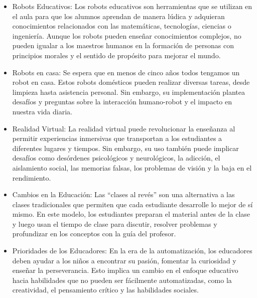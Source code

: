 \documentclass[letterpaper, 12pt]{article}
\begin{document}
\begin{itemize}[label=$\triangleright$]
      \item Robots Educativos: Los robots educativos son herramientas
            que se utilizan en el aula para que los alumnos aprendan de
            manera lúdica y adquieran conocimientos relacionados con
            las matemáticas, tecnologías, ciencias o ingeniería. Aunque
            los robots pueden enseñar conocimientos complejos, no
            pueden igualar a los maestros humanos en la formación de
            personas con principios morales y el sentido de propósito
            para mejorar el mundo.

      \item Robots en casa: Se espera que en menos de cinco años todos
            tengamos un robot en casa. Estos robots domésticos pueden
            realizar diversas tareas, desde limpieza hasta asistencia
            personal. Sin embargo, su implementación plantea desafíos y
            preguntas sobre la interacción humano-robot y el impacto en
            nuestra vida diaria.

      \item Realidad Virtual: La realidad virtual puede revolucionar la
            enseñanza al permitir experiencias inmersivas que
            transportan a los estudiantes a diferentes lugares y
            tiempos. Sin embargo, su uso también puede implicar
            desafíos como desórdenes psicológicos y neurológicos, la
            adicción, el aislamiento social, las memorias falsas, los
            problemas de visión y la baja en el rendimiento.

      \item Cambios en la Educación: Las ``clases al revés'' son una
            alternativa a las clases tradicionales que permiten que
            cada estudiante desarrolle lo mejor de sí mismo. En este
            modelo, los estudiantes preparan el material antes de la
            clase y luego usan el tiempo de clase para discutir,
            resolver problemas y profundizar en los conceptos con la
            guía del profesor.

      \item Prioridades de los Educadores: En la era de la
            automatización, los educadores deben ayudar a los niños a
            encontrar su pasión, fomentar la curiosidad y enseñar la
            perseverancia. Esto implica un cambio en el enfoque
            educativo hacia habilidades que no pueden ser fácilmente
            automatizadas, como la creatividad, el pensamiento crítico
            y las habilidades sociales.
\end{itemize}
\end{document}
